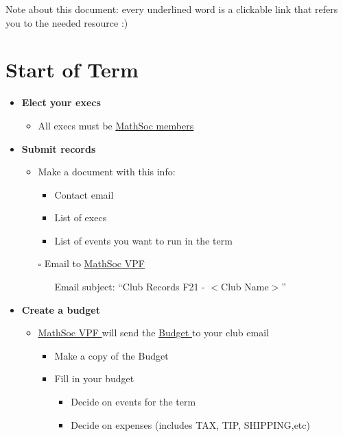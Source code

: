 \documentclass[utf8]{article}
\makeatletter
\newcommand{\termandyear}{F21 }
\newcommand{\budget}{\href{https://drive.google.com/file/d/1uQIh7Qp33NX0TgJhl3DdY-r2HqZzQKuZ/view}{\underline{Budget} }}
\newcommand{\MathSocVPF}{\href{mailto:vpf@mathsoc.uwaterloo.ca}{\underline{MathSoc VPF} }}
\newcommand{\membership}{\hyperref[sec:membership]{\underline{MathSoc members}}}
\makeatother
\begin{document}
\maketitle
Note about this document: every underlined word is a clickable link that refers you to the needed resource :)

\section*{Start of Term}
\begin{itemize}
    \item \textbf{Elect your execs}
    \begin{itemize}
        \item All execs must be \membership
    \end{itemize}
    \item \textbf{Submit records}
    \begin{itemize}
        \item Make a document with this info:
        \begin{itemize}
            \item Contact email
            \item List of execs
            \item List of events you want to run in the term
        \end{itemize}
        \item[$\square$] Email to \MathSocVPF 
        \begin{itemize}
            \item[\textperiodcentered] Email subject: ``Club Records \termandyear - $<$Club Name$>$''
        \end{itemize}
    \end{itemize}
    \item \textbf{Create a budget}
    \begin{itemize}
        \item \MathSocVPF will send the \budget to your club email
        \begin{itemize}
            \item Make a copy of the Budget
            \item Fill in your budget
            \begin{itemize}
                \item Decide on events for the term
                \item Decide on expenses (includes TAX, TIP, SHIPPING,etc)

\end{itemize}
\end{itemize}
\end{itemize}
\end{itemize}
\end{document}
